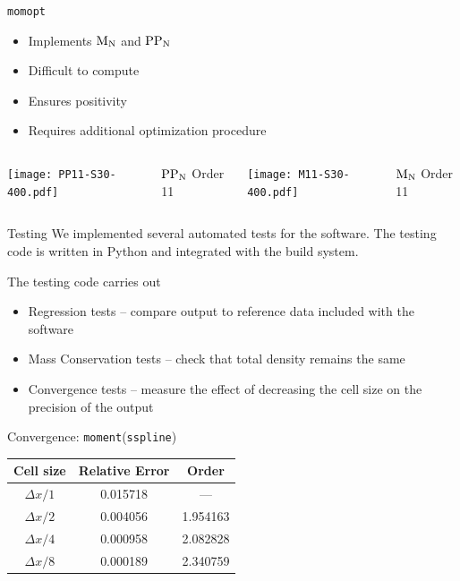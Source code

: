 \documentclass{beamer}
\newcommand{\MN}{\ensuremath{\textnormal{M}_\textnormal{N}}\xspace}
\newcommand{\PPN}{\ensuremath{\textnormal{PP}_\textnormal{N}}\xspace}
\newcommand{\moment}{\texttt{moment}\xspace}
\newcommand{\momopt}{\texttt{momopt}\xspace}
\begin{document}
    \begin{frame}{\momopt}
        \begin{itemize}
            \item Implements \MN and \PPN
            \item Difficult to compute
            \item Ensures positivity
            \item Requires additional optimization procedure
        \end{itemize}

        \vfill

        \begin{columns}
            \centering
            \texttt{[image: PP11-S30-400.pdf]}

            \PPN Order 11

            \centering
            \texttt{[image: M11-S30-400.pdf]}

            \MN Order 11
        \end{columns}
    \end{frame}

    \begin{frame}[fragile=singleslide]{Testing}
        We implemented several automated tests for the software.
        The testing code is written in Python and integrated with the build system.

        \vfill

        The testing code carries out
        \begin{itemize}
            \item Regression tests -- compare output to reference data included with the software
            \item Mass Conservation tests -- check that total density remains the same
            \item Convergence tests -- measure the effect of decreasing the cell size on the precision of the output
        \end{itemize}

        \vfill

        \begin{block}{Convergence: \moment (\texttt{sspline})}
            \centering
            \begin{tabular}{ccc}
                \toprule
                Cell size & Relative Error & Order \\
                \midrule
                $\Delta x / 1$ & 0.015718 & --- \\
                $\Delta x / 2$ & 0.004056 & 1.954163 \\
                $\Delta x / 4$ & 0.000958 & 2.082828 \\
                $\Delta x / 8$ & 0.000189 & 2.340759 \\
                \bottomrule
            \end{tabular}
        \end{block}
    \end{frame}
\end{document}
